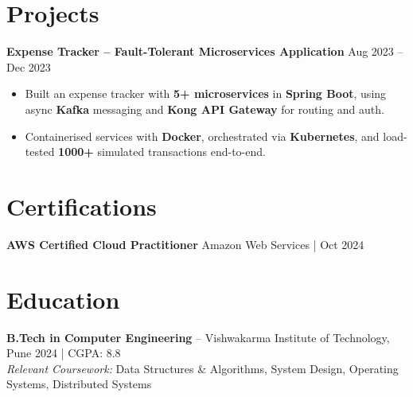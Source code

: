 \documentclass[a4paper,10pt]{article}
\begin{document}
\section*{Projects}

\textbf{Expense Tracker -- Fault-Tolerant Microservices Application} \hfill Aug 2023 -- Dec 2023
\begin{itemize}[leftmargin=*]
    \item Built an expense tracker with \textbf{5+ microservices} in \textbf{Spring Boot}, using async \textbf{Kafka} messaging and \textbf{Kong API Gateway} for routing and auth.
    \item Containerised services with \textbf{Docker}, orchestrated via \textbf{Kubernetes}, and load-tested \textbf{1000+} simulated transactions end-to-end.
\end{itemize}

\section*{Certifications}
\textbf{AWS Certified Cloud Practitioner} \hfill Amazon Web Services \;|\; Oct 2024

\section*{Education}
\textbf{B.Tech in Computer Engineering} -- Vishwakarma Institute of Technology, Pune \hfill 2024 \;|\; CGPA: 8.8 \\
\textit{Relevant Coursework:} Data Structures \& Algorithms, System Design, Operating Systems, Distributed Systems
\end{document}
